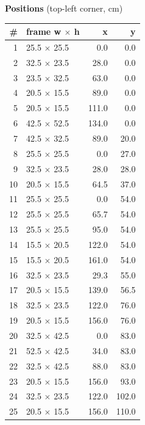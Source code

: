 \documentclass[a4paper,landscape,10pt]{article}
\begin{document}
\begin{minipage}[t]{0.25\textwidth}
\vspace{8pt}
{\bfseries Positions} (top-left corner, cm)\\[2pt]
\tiny
\begin{tabular}{@{}r l r r@{}}
\toprule
\# & frame w $\times$ h & x & y \\
\midrule
1 & 25.5 $\times$ 25.5 & 0.0 & 0.0 \\
2 & 32.5 $\times$ 23.5 & 28.0 & 0.0 \\
3 & 23.5 $\times$ 32.5 & 63.0 & 0.0 \\
4 & 20.5 $\times$ 15.5 & 89.0 & 0.0 \\
5 & 20.5 $\times$ 15.5 & 111.0 & 0.0 \\
6 & 42.5 $\times$ 52.5 & 134.0 & 0.0 \\
7 & 42.5 $\times$ 32.5 & 89.0 & 20.0 \\
8 & 25.5 $\times$ 25.5 & 0.0 & 27.0 \\
9 & 32.5 $\times$ 23.5 & 28.0 & 28.0 \\
10 & 20.5 $\times$ 15.5 & 64.5 & 37.0 \\
11 & 25.5 $\times$ 25.5 & 0.0 & 54.0 \\
12 & 25.5 $\times$ 25.5 & 65.7 & 54.0 \\
13 & 25.5 $\times$ 25.5 & 95.0 & 54.0 \\
14 & 15.5 $\times$ 20.5 & 122.0 & 54.0 \\
15 & 15.5 $\times$ 20.5 & 161.0 & 54.0 \\
16 & 32.5 $\times$ 23.5 & 29.3 & 55.0 \\
17 & 20.5 $\times$ 15.5 & 139.0 & 56.5 \\
18 & 32.5 $\times$ 23.5 & 122.0 & 76.0 \\
19 & 20.5 $\times$ 15.5 & 156.0 & 76.0 \\
20 & 32.5 $\times$ 42.5 & 0.0 & 83.0 \\
21 & 52.5 $\times$ 42.5 & 34.0 & 83.0 \\
22 & 32.5 $\times$ 42.5 & 88.0 & 83.0 \\
23 & 20.5 $\times$ 15.5 & 156.0 & 93.0 \\
24 & 32.5 $\times$ 23.5 & 122.0 & 102.0 \\
25 & 20.5 $\times$ 15.5 & 156.0 & 110.0 \\
\bottomrule
\end{tabular}
\end{minipage}
\clearpage
\end{document}
